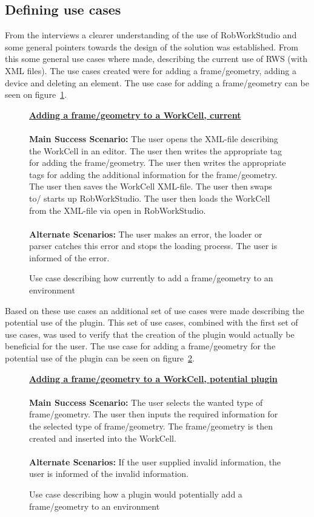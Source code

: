 \subsection{Defining use cases}
From the interviews a clearer understanding of the use of RobWorkStudio and some general pointers towards the design of the solution was established. From this some general use cases where made, describing the current use of RWS (with XML files). The use cases created were for adding a frame/geometry, adding a device and deleting an element. The use case for adding a frame/geometry can be seen on figure~\ref{fig:currentUseCase}.

\begin{figure}
\begin{framed}
\underline{\textbf{Adding a frame/geometry to a WorkCell, current}}\\\\
\textbf{Main Success Scenario:} The user opens the XML-file describing the WorkCell in an editor. The user then writes the appropriate tag for adding the frame/geometry. The user then writes the appropriate tags for adding the additional information for the frame/geometry. The user then saves the WorkCell XML-file. The user then swaps to/ starts up RobWorkStudio. The user then loads the WorkCell from the XML-file via open in RobWorkStudio.\\\\
\textbf{Alternate Scenarios:} The user makes an error, the loader or parser catches this error and stops the loading process. The user is informed of the error.
\end{framed}
\caption{Use case describing how currently to add a frame/geometry to an environment}
\label{fig:currentUseCase}
\end{figure}

Based on these use cases an additional set of use cases were made describing the potential use of the plugin. This set of use cases, combined with the first set of use cases, was used to verify that the creation of the plugin would actually be beneficial for the user. The use case for adding a frame/geometry for the potential use of the plugin can be seen on figure~\ref{fig:pluginUseCase}.

\begin{figure}
\begin{framed}
\underline{\textbf{Adding a frame/geometry to a WorkCell, potential plugin}}\\\\
\textbf{Main Success Scenario:} The user selects the wanted type of frame/geometry. The user then inputs the required information for the selected type of frame/geometry. The frame/geometry is then created and inserted into the WorkCell.\\\\
\textbf{Alternate Scenarios:} If the user supplied invalid information, the user is informed of the invalid information.
\end{framed}
\caption{Use case describing how a plugin would potentially add a frame/geometry to an environment}
\label{fig:pluginUseCase}
\end{figure}

